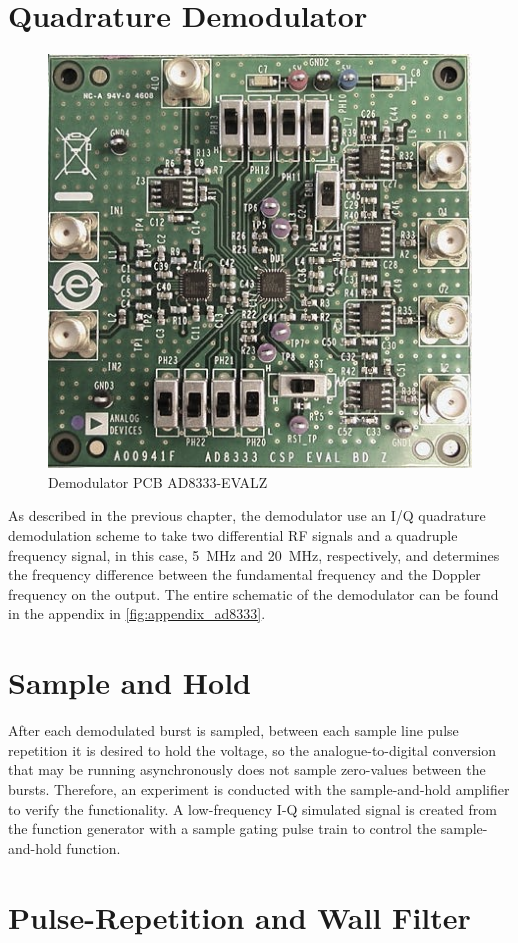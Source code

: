 \section{Quadrature Demodulator}
\begin{figure}[htbp]
	\centering
	\includegraphics[width=.8\textwidth]{Figures/4_demod_pcb_pic.jpg}
	\caption{Demodulator PCB AD8333-EVALZ}
	\label{fig:4_demod_pcb_pic}
\end{figure}
As described in the previous chapter, the demodulator use an I/Q quadrature demodulation scheme to take two differential RF signals and a quadruple frequency signal, in this case, \qty{5}{\mega\hertz} and \qty{20}{\mega\hertz}, respectively, and determines the frequency difference between the fundamental frequency and the Doppler frequency on the output.
The entire schematic of the demodulator can be found in the appendix in \cref{fig:appendix_ad8333}.
\section{Sample and Hold}
After each demodulated burst is sampled, between each sample line pulse repetition it is desired to hold the voltage, so the analogue-to-digital conversion that may be running asynchronously does not sample zero-values between the bursts. Therefore, an experiment is conducted with the sample-and-hold amplifier to verify the functionality. A low-frequency I-Q simulated signal is created from the function generator with a sample gating pulse train to control the sample-and-hold function.

\section{Pulse-Repetition and Wall Filter}
